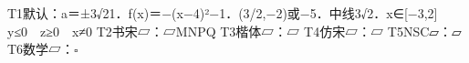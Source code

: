 \documentclass[fontset=none]{ctexart}
\begin{document}
T1默认：a＝±3√21．f(x)＝−(x−4)²−1．(3/2,−2)或−5．中线3√2．x∈[−3,2]　y≤0　z≥0　x≠0
T2书宋▱：{\CJKfamily{}}▱MNPQ
T3楷体▱：{\kaif ▱}
T4仿宋▱：{\fsf ▱}
T5NSC▱：{\nscf ▱}
T6数学▱：$\square$
\end{document}
